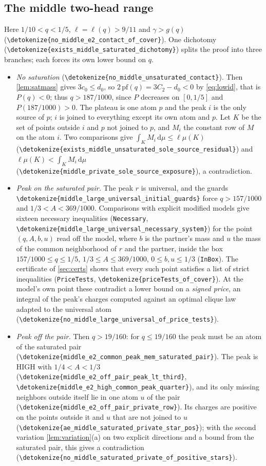 \documentclass[10pt]{article}
\theoremstyle{definition}
\theoremstyle{remark}
\numberwithin{equation}{section}
\newcommand{\dd}{\mathrm{d}}
\newcommand{\lean}[1]{\texttt{#1}}
\newcommand{\leanid}[1]{\expandafter\nolinkurl\expandafter{\detokenize{#1}}}
\newcommand{\Fm}[1]{\cite[#1]{Formalization}}
\begin{document}
\subsection{The middle two-head range}\label{sec:middleE2}
Here $1/10<q<1/5$, $\ell=\ell(q)>9/11$ and $\gamma>g(q)$~\Fm{\S10.4} (\leanid{no_middle_e2_contact_of_cover}). One dichotomy (\leanid{exists_middle_saturated_dichotomy}) splits the proof into three branches; each forces its own lower bound on $q$.
\begin{itemize}[leftmargin=1.5em]
\item \emph{No saturation} (\leanid{no_middle_unsaturated_contact}). Then \cref{lem:satmass} gives $3c_0\le d_0$, so $2\,\mathrm{pf}(q)=3C_2-d_0<0$ by \eqref{eq:lowid}, that is $P(q)<0$; thus $q>187/1000$, since $P$ decreases on $[0,1/5]$ and $P(187/1000)>0$. The plateau is one atom $p$ and the peak $i$ is the only source of $p$; $i$ is joined to everything except its own atom and $p$. Let $K$ be the set of points outside $i$ and $p$ not joined to $p$, and $M_i$ the constant row of $M$ on the atom $i$. Two comparisons give $\int_KM_i\,\dd\mu\le\ell\mu(K)$ (\leanid{exists_middle_unsaturated_sole_source_residual}) and $\ell\mu(K)<\int_KM_i\,\dd\mu$ (\leanid{middle_private_sole_source_exposure}), a contradiction.
\item \emph{Peak on the saturated pair.} The peak $r$ is universal, and the guards \leanid{middle_large_universal_initial_guards} force $q>157/1000$ and $1/3<A<369/1000$. Comparisons with explicit modified models give sixteen necessary inequalities (\lean{Necessary}, \leanid{middle_large_universal_necessary_system}) for the point $(q,A,b,u)$ read off the model, where $b$ is the partner's mass and $u$ the mass of the common neighborhood of $r$ and the partner, inside the box $157/1000\le q\le1/5$, $1/3\le A\le369/1000$, $0\le b,u\le1/3$ (\lean{InBox}). The certificate of \cref{sec:certs} shows that every such point satisfies a list of strict inequalities (\lean{PriceTests}, \leanid{priceTests_of_cover}). At the model's own point these contradict a lower bound on a \emph{signed price}, an integral of the peak's charges computed against an optimal clique law adapted to the universal atom (\leanid{no_middle_large_universal_of_price_tests}).
\item \emph{Peak off the pair.} Then $q>19/160$: for $q\le19/160$ the peak must be an atom of the saturated pair (\leanid{middle_e2_common_peak_mem_saturated_pair}). The peak is HIGH with $1/4<A<1/3$ (\leanid{middle_e2_off_pair_peak_lt_third}, \leanid{middle_e2_high_common_peak_quarter}), and its only missing neighbors outside itself lie in one atom $u$ of the pair (\leanid{middle_e2_off_pair_private_row}). Its charges are positive on the points outside it and $u$ that are not joined to $u$ (\leanid{ae_middle_saturated_private_star_pos}); with the second variation \cref{lem:variation}(a) on two explicit directions and a bound from the saturated pair, this gives a contradiction (\leanid{no_middle_saturated_private_of_positive_stars}).
\end{itemize}
\end{document}
